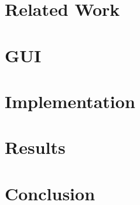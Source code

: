 \section{Related Work}
\label{sec:related}


\section{\framework}
\label{sec:framework}


\section{\framework GUI}
\label{sec:gui}


\section{Implementation}
\label{sec:implementation}


\section{Results}
\label{sec:results}


\section{Conclusion}
\label{sec:conclusion}




